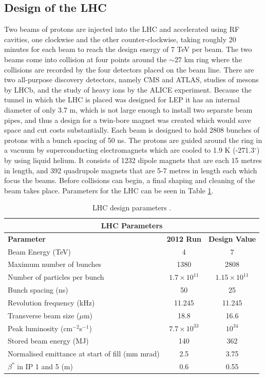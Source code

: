 \subsection{Design of the LHC}

Two beams of protons are injected into the LHC and accelerated using RF cavities, one clockwise and the other counter-clockwise, taking roughly 20 minutes for each beam to reach the design energy of 7 TeV per beam. The two beams come into collision at four points around the $\sim27$ km ring where the collisions are recorded by the four detectors placed on the beam line. There are two all-purpose discovery detectors, namely CMS and ATLAS, studies of mesons by LHCb, and the study of heavy ions by the ALICE experiment. Because the tunnel in which the LHC is placed was designed for LEP it has an internal diameter of only 3.7 m, which is not large enough to install two separate beam pipes, and thus a design for a twin-bore magnet \cite{LHCStorageAccelerators}was created which would save space and cut costs substantially. Each beam is designed to hold 2808 bunches of protons with a bunch spacing of 50 ns. The protons are guided around the ring in a vacuum by superconducting electromagnets which are cooled to 1.9 K (-271.3$^\circ$) by using liquid helium. It consists of 1232 dipole magnets that are each 15 metres in length, and 392 quadrupole magnets that are 5-7 metres in length each which focus the beams. Before collisions can begin, a final shaping and cleaning of the beam takes place. Parameters for the LHC can be seen in Table \ref{tab-LHCparameters}.

\begin{table} \label{tab-LHCparameters}
\begin{center}
\begin{tabular}{|l|c|c|}
\hline
	\multicolumn{3}{|c|}{\textbf{LHC Parameters}} \\
\hline
	\textbf{Parameter} & \textbf{2012 Run} & \textbf{Design Value} \\
\hline	
	Beam Energy (TeV) & 4 & 7 \\
	Maximum number of bunches  & 1380 & 2808 \\
	Number of particles per bunch & $1.7\times 10^{11}$ & $1.15\times 10^{11}$ \\
	Bunch spacing (ns) & 50 & 25 \\
	Revolution frequency (kHz) & 11.245 & 11.245 \\
	Transverse beam size ($\mu$m) & 18.8 & 16.6 \\
	Peak luminosity (cm$^{-2}$s$^{-1}$) & $7.7\times 10^{33}$ & $10^{34}$ \\
	Stored beam energy (MJ) & 140 & 362 \\
	Normalised emittance at start of fill (mm mrad) & 2.5 & 3.75 \\
	$\beta^*$ in IP 1 and 5 (m) & 0.6 & 0.55 \\
\hline
\end{tabular}
\end{center}
\caption{LHC design parameters \cite{LHCDesignReport}.}
\end{table}


